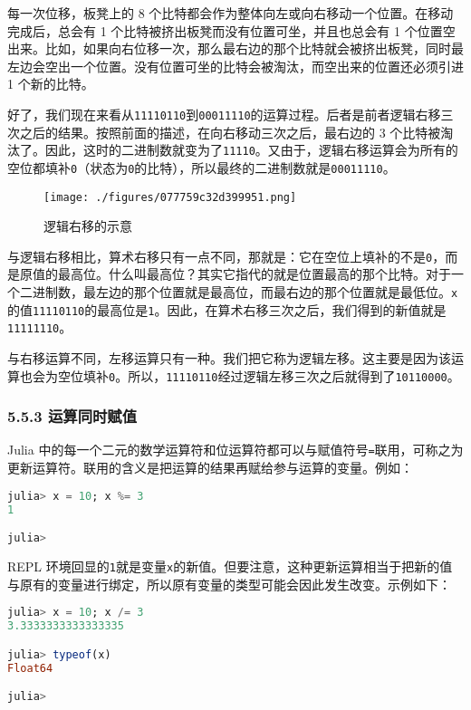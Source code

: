 每一次位移，板凳上的 8 个比特都会作为整体向左或向右移动一个位置。在移动完成后，总会有 1 个比特被挤出板凳而没有位置可坐，并且也总会有 1 个位置空出来。比如，如果向右位移一次，那么最右边的那个比特就会被挤出板凳，同时最左边会空出一个位置。没有位置可坐的比特会被淘汰，而空出来的位置还必须引进 1 个新的比特。

好了，我们现在来看从\verb|11110110|到\verb|00011110|的运算过程。后者是前者逻辑右移三次之后的结果。按照前面的描述，在向右移动三次之后，最右边的 3 个比特被淘汰了。因此，这时的二进制数就变为了\verb|11110|。又由于，逻辑右移运算会为所有的空位都填补\verb|0|（状态为\verb|0|的比特），所以最终的二进制数就是\verb|00011110|。
\begin{figure}[ht]
\centering
\texttt{[image: ./figures/077759c32d399951.png]}
\caption{逻辑右移的示意} \label{fig_JuC5S5_1}
\end{figure}

与逻辑右移相比，算术右移只有一点不同，那就是：它在空位上填补的不是\verb|0|，而是原值的最高位。什么叫最高位？其实它指代的就是位置最高的那个比特。对于一个二进制数，最左边的那个位置就是最高位，而最右边的那个位置就是最低位。\verb|x|的值\verb|11110110|的最高位是\verb|1|。因此，在算术右移三次之后，我们得到的新值就是\verb|11111110|。

与右移运算不同，左移运算只有一种。我们把它称为逻辑左移。这主要是因为该运算也会为空位填补\verb|0|。所以，\verb|11110110|经过逻辑左移三次之后就得到了\verb|10110000|。

\subsubsection{5.5.3 运算同时赋值}

Julia 中的每一个二元的数学运算符和位运算符都可以与赋值符号\verb|=|联用，可称之为更新运算符。联用的含义是把运算的结果再赋给参与运算的变量。例如：
\begin{lstlisting}[language=julia]
julia> x = 10; x %= 3
1

julia>
\end{lstlisting}

REPL 环境回显的\verb|1|就是变量\verb|x|的新值。但要注意，这种更新运算相当于把新的值与原有的变量进行绑定，所以原有变量的类型可能会因此发生改变。示例如下：
\begin{lstlisting}[language=julia]
julia> x = 10; x /= 3
3.3333333333333335

julia> typeof(x)
Float64

julia> 
\end{lstlisting}

